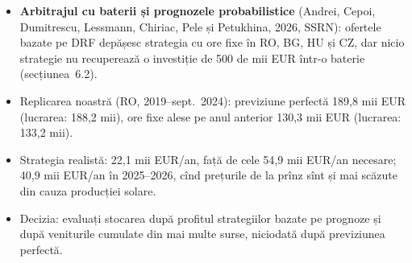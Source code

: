 \begin{itemize}\setlength{\itemsep}{2pt}
  \item \textbf{Arbitrajul cu baterii și prognozele probabilistice} (Andrei, Cepoi, Dumitrescu, Lessmann, Chiriac, Pele și Petukhina, 2026, SSRN): ofertele bazate pe DRF depășesc strategia cu ore fixe în RO, BG, HU și CZ, dar nicio strategie nu recuperează o investiție de 500 de mii EUR într-o baterie (secțiunea~6.2).
  \item Replicarea noastră (RO, 2019--sept.\ 2024): previziune perfectă 189,8 mii EUR (lucrarea: 188,2 mii), ore fixe alese pe anul anterior 130,3 mii EUR (lucrarea: 133,2 mii).
  \item Strategia realistă: 22,1 mii EUR/an, față de cele 54,9 mii EUR/an necesare; 40,9 mii EUR/an în 2025--2026, cînd prețurile de la prînz sînt și mai scăzute din cauza producției solare.
  \item Decizia: evaluați stocarea după profitul strategiilor bazate pe prognoze și după veniturile cumulate din mai multe surse, niciodată după previziunea perfectă.
\end{itemize}
